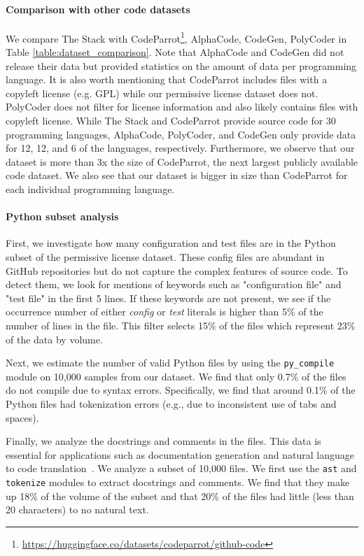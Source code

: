 \paragraph{Comparison with other code datasets} We compare The Stack with CodeParrot\footnote{\url{https://huggingface.co/datasets/codeparrot/github-code}}, AlphaCode\citep{li2022competition}, CodeGen\citep{Nijkamp2022ACP}, PolyCoder\citep{xu2022systematicevaluation} in Table \ref{table:dataset_comparison}. Note that AlphaCode and CodeGen did not release their data but provided statistics on the amount of data per programming language. It is also worth mentioning that CodeParrot includes files with a copyleft license (e.g. GPL) while our permissive license dataset does not. PolyCoder does not filter for license information and also likely contains files with copyleft license. While The Stack and CodeParrot provide source code for 30 programming languages, AlphaCode, PolyCoder, and CodeGen only provide data for 12, 12, and 6 of the languages, respectively. Furthermore, we observe that our dataset is more than 3x the size of CodeParrot, the next largest publicly available code dataset. We also see that our dataset is bigger in size than CodeParrot for each individual programming language.

\paragraph{Python subset analysis}

First, we investigate how many configuration and test files are in the Python subset of the permissive license dataset. These config files are abundant in GitHub repositories but do not capture the complex features of source code. To detect them, we look for mentions of keywords such as "configuration file" and "test file" in the first 5 lines. If these keywords are not present, we see if the occurrence number of either \textit{config} or \textit{test} literals is higher than 5\% of the number of lines in the file. This filter selects 15\% of the files which represent 23\% of the data by volume.

Next, we estimate the number of valid Python files by using the \texttt{py\_compile} module on 10,000 samples from our dataset. We find that only 0.7\% of the files do not compile due to syntax errors. Specifically, we find that around 0.1\% of the Python files had tokenization errors (e.g., due to inconsistent use of tabs and spaces). 

Finally, we analyze the docstrings and comments in the files. This data is essential for applications such as documentation generation and natural language to code translation~\citep{chen2021codex,feng-etal-2020-codebert}. We analyze a subset of 10,000 files. We first use the \texttt{ast} and \texttt{tokenize} modules to extract docstrings and comments. We find that they make up 18\% of the volume of the subset and that 20\% of the files had little (less than 20 characters) to no natural text.

